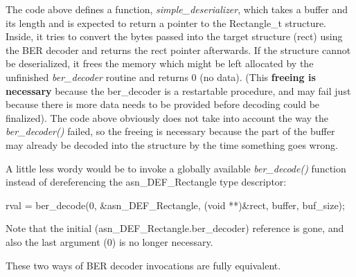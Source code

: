 \documentclass[english,oneside,12pt]{book}
\begin{document}
The code above defines a function, \emph{simple\_deserializer}, which
takes a buffer and its length and is expected to return a pointer
to the Rectangle\_t structure. Inside, it tries to convert the bytes
passed into the target structure (rect) using the BER decoder and
returns the rect pointer afterwards. If the structure cannot be deserialized,
it frees the memory which might be left allocated by the unfinished
\emph{ber\_decoder} routine and returns 0 (no data). (This \textbf{freeing
is necessary} because the ber\_decoder is a restartable procedure,
and may fail just because there is more data needs to be provided
before decoding could be finalized). The code above obviously does
not take into account the way the \emph{ber\_decoder()} failed, so
the freeing is necessary because the part of the buffer may already
be decoded into the structure by the time something goes wrong.

A little less wordy would be to invoke a globally available \emph{ber\_decode()}
function instead of dereferencing the asn\_DEF\_Rectangle type descriptor:
\begin{codesample}
rval = ber_decode(0, &asn_DEF_Rectangle, (void **)&rect, buffer, buf_size);
\end{codesample}
Note that the initial (asn\_DEF\_Rectangle.ber\_decoder) reference
is gone, and also the last argument (0) is no longer necessary.

These two ways of BER decoder invocations are fully equivalent.
\end{document}
